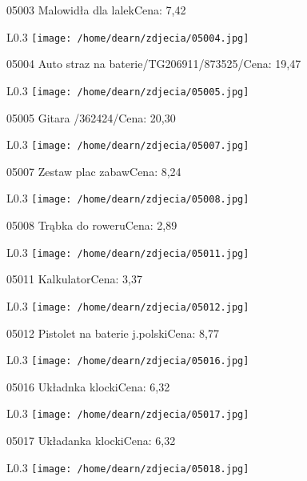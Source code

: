 05003 Malowidła dla lalekCena: 7,42\newline
\begin{wrapfigure}{L}{0.3\textwidth}
\texttt{[image: /home/dearn/zdjecia/05004.jpg]}
\end{wrapfigure}
05004 Auto straz na baterie/TG206911/873525/Cena: 19,47\newline
\begin{wrapfigure}{L}{0.3\textwidth}
\texttt{[image: /home/dearn/zdjecia/05005.jpg]}
\end{wrapfigure}
05005 Gitara /362424/Cena: 20,30\newline
\begin{wrapfigure}{L}{0.3\textwidth}
\texttt{[image: /home/dearn/zdjecia/05007.jpg]}
\end{wrapfigure}
05007 Zestaw plac zabawCena: 8,24\newline
\begin{wrapfigure}{L}{0.3\textwidth}
\texttt{[image: /home/dearn/zdjecia/05008.jpg]}
\end{wrapfigure}
05008 Trąbka do roweruCena: 2,89\newline
\begin{wrapfigure}{L}{0.3\textwidth}
\texttt{[image: /home/dearn/zdjecia/05011.jpg]}
\end{wrapfigure}
05011 KalkulatorCena: 3,37\newline
\begin{wrapfigure}{L}{0.3\textwidth}
\texttt{[image: /home/dearn/zdjecia/05012.jpg]}
\end{wrapfigure}
05012 Pistolet na baterie j.polskiCena: 8,77\newline
\begin{wrapfigure}{L}{0.3\textwidth}
\texttt{[image: /home/dearn/zdjecia/05016.jpg]}
\end{wrapfigure}
05016 Układnka klockiCena: 6,32\newline
\begin{wrapfigure}{L}{0.3\textwidth}
\texttt{[image: /home/dearn/zdjecia/05017.jpg]}
\end{wrapfigure}
05017 Układanka klockiCena: 6,32\newline
\begin{wrapfigure}{L}{0.3\textwidth}
\texttt{[image: /home/dearn/zdjecia/05018.jpg]}
\end{wrapfigure}
